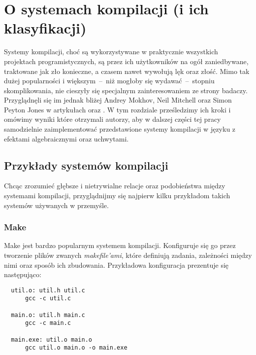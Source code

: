 
\newcommand{\inl}[1]{\lstinline[style=haskell-inl]{#1}}

\chapter{O systemach kompilacji (i ich klasyfikacji)}
\label{chapter-bsalc}

Systemy kompilacji, choć są wykorzystywane w praktycznie wszystkich projektach programistycznych, są przez ich użytkowników na ogół zaniedbywane, traktowane jak zło konieczne, a czasem nawet wywołują lęk oraz złość. Mimo tak dużej popularności i większym~--~niż mogłoby się wydawać~--~stopniu skomplikowania, nie cieszyły się specjalnym zainteresowaniem ze strony badaczy. Przyglądnęli się im jednak bliżej Andrey Mokhov, Neil Mitchell oraz Simon Peyton Jones w artykułach \BSaLC\cite{mokhov2018build} oraz \BSaLCTP\cite{mokhov2020build}. W tym rozdziale prześledzimy ich kroki i omówimy wyniki które otrzymali autorzy, aby w dalszej części tej pracy samodzielnie zaimplementować przedstawione systemy kompilacji w języku z efektami algebraicznymi oraz uchwytami.

\section{Przykłady systemów kompilacji}

Chcąc zrozumieć głębsze i nietrywialne relacje oraz podobieństwa między systemami kompilacji, przyglądnijmy się najpierw kilku przykładom takich systemów używanych w przemyśle.

\subsection{Make}

Make jest bardzo popularnym systemem kompilacji. Konfiguruje się go przez tworzenie plików zwanych \textit{makefile'ami}, które definiują zadania, zależności między nimi oraz sposób ich zbudowania. Przykładowa konfiguracja prezentuje się następująco:

\lstset{language=make}

\begin{lstlisting}
  util.o: util.h util.c
      gcc -c util.c

  main.o: util.h main.c
      gcc -c main.c

  main.exe: util.o main.o
      gcc util.o main.o -o main.exe
\end{lstlisting}

